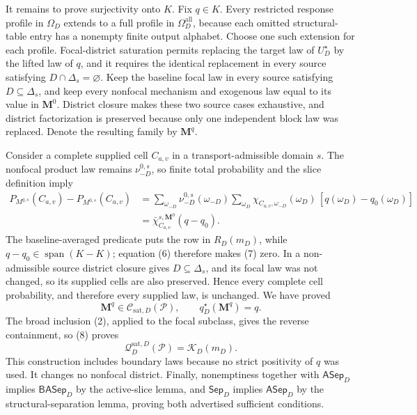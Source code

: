 It remains to prove surjectivity onto \(K\). Fix \(q\in K\). Every restricted response profile in \(\Omega_D\) extends to a full profile in \(\Omega_D^{\mathrm{all}}\), because each omitted structural-table entry has a nonempty finite output alphabet. Choose one such extension for each profile. Focal-district saturation permits replacing the target law of \(U_D^\star\) by the lifted law of \(q\), and it requires the identical replacement in every source satisfying \(D\cap\Delta_s=\varnothing\). Keep the baseline focal law in every source satisfying \(D\subseteq\Delta_s\), and keep every nonfocal mechanism and exogenous law equal to its value in \(\mathbf M^0\). District closure makes these two source cases exhaustive, and district factorization is preserved because only one independent block law was replaced. Denote the resulting family by \(\mathbf M^q\).

Consider a complete supplied cell \(C_{a,v}\) in a transport-admissible domain \(s\). The nonfocal product law remains \(\nu_{-D}^{0,s}\), so finite total probability and the slice definition imply
\[
\begin{aligned}
P_{M^{q,s}}(C_{a,v})-P_{M^{0,s}}(C_{a,v})
&=\sum_{\omega_{-D}}\nu_{-D}^{0,s}(\omega_{-D})
\sum_{\omega_D}\chi_{C_{a,v},\omega_{-D}}(\omega_D)\,[q(\omega_D)-q_0(\omega_D)]\\
&=\bar\chi_{C_{a,v}}^{s,\mathbf M^0}(q-q_0).
\end{aligned}\tag{7}
\]
The baseline-averaged predicate puts the row in \(R_D(m_D)\), while \(q-q_0\in\operatorname{span}(K-K)\); equation (6) therefore makes (7) zero. In a non-admissible source district closure gives \(D\subseteq\Delta_s\), and its focal law was not changed, so its supplied cells are also preserved. Hence every complete cell probability, and therefore every supplied law, is unchanged. We have proved
\[
\mathbf M^q\in\mathcal C_{\mathrm{sat},D}(\mathcal P),\qquad
q_D^\star(\mathbf M^q)=q.\tag{8}
\]
The broad inclusion (2), applied to the focal subclass, gives the reverse containment, so (8) proves
\[
\mathcal Q_D^{\mathrm{sat},D}(\mathcal P)=\mathcal K_D(m_D).\tag{9}
\]
This construction includes boundary laws because no strict positivity of \(q\) was used. It changes no nonfocal district. Finally, nonemptiness together with \(\mathsf{ASep}_D\) implies \(\mathsf{BASep}_D\) by the active-slice lemma, and \(\mathsf{Sep}_D\) implies \(\mathsf{ASep}_D\) by the structural-separation lemma, proving both advertised sufficient conditions.